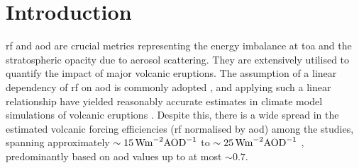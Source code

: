\documentclass{ametsocV6.1}
\begin{document}

\section{Introduction}



\Gls{rf} and \gls{aod} are crucial metrics representing the energy imbalance at
\gls{toa} and the stratospheric opacity due to aerosol scattering. They are extensively
utilised to quantify the impact of major volcanic eruptions. The assumption of a linear
dependency of \gls{rf} on \gls{aod} is commonly adopted \citep{myhre2013,andersson2015},
and applying such a linear relationship have yielded reasonably accurate estimates in
climate model simulations of volcanic eruptions
\citep{mills2017,hansen2005,gregory2016,marshall2020,pitari2016b}. Despite this, there
is a wide spread in the estimated volcanic forcing efficiencies (\gls{rf} normalised by
\gls{aod}) among the studies, spanning approximately \(\sim
\SI{15}{\watt\metre^{-2}\ce{AOD}^{-1}}\) \citep{pitari2016b} to \(\sim
\SI{25}{\watt\metre^{-2}\ce{AOD}^{-1}}\) \citep{myhre2013}, predominantly based on
\gls{aod} values up to at most \(\sim 0.7\).
\end{document}
